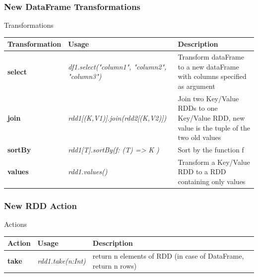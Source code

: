 \documentclass[slidetop,9pt,utf8]{beamer}
\begin{document}
\begin{frame}

  \frametitle{New DataFrame Transformations}

  \begin{block}{Transformations}
    \begin{center}
      \begin{tabular}{|m{2.1cm}|m{3.5cm}|m{5cm}|}
        \hline 
        \rowcolor{gray} \textbf{Transformation} & \textbf{Usage} & \textbf{Description} \\ \hline
        \textbf{select} & \textit{df1.select("column1", "column2", "column3")} & Transform dataFrame to a new dataFrame with columns specified as argument \\ \hline
        \textbf{join} & \textit{rdd1[(K,V1)]\newline  .join(rdd2[(K,V2)])} & Join two Key/Value RDDs to one Key/Value RDD, new value is the tuple of the two old values \\ \hline
        \textbf{sortBy} & \textit{rdd1[T]\newline  .sortBy(f: (T) =\textgreater\xspace K )} & Sort by the function f \\ \hline
        \textbf{values} & \textit{rdd1.values()} & Transform a Key/Value RDD to a RDD containing only values \\ \hline
      \end{tabular}
    \end{center}
  \end{block}

\end{frame}

\begin{frame}

  \frametitle{New RDD Action}

  \begin{block}{Actions}
    \begin{center}
      \begin{tabular}{|m{2.1cm}|m{3.5cm}|m{5cm}|}
        \hline 
        \rowcolor{gray} \textbf{Action} & \textbf{Usage} & \textbf{Description} \\ \hline
        \textbf{take} & \textit{rdd1.take(n:Int)} & return n elements of RDD (in case of DataFrame, return n rows) \\ \hline
      \end{tabular}
    \end{center}
  \end{block}

\end{frame}
\end{document}

